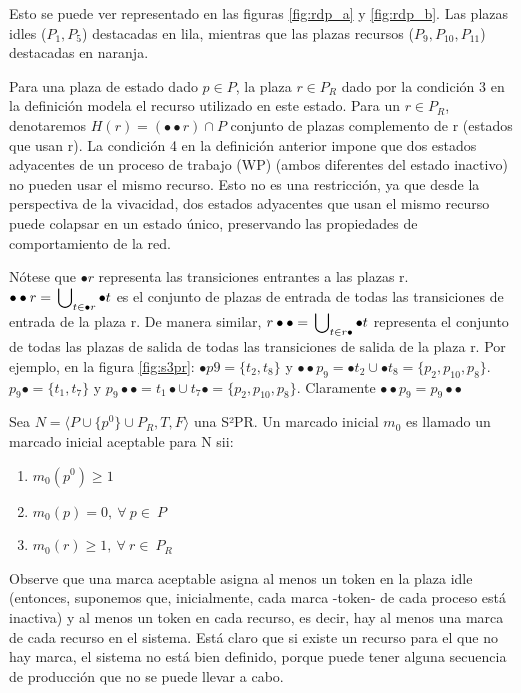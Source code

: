 \noindent Esto se puede ver representado en las figuras \ref{fig:rdp_a} y \ref{fig:rdp_b}. Las plazas idles ($P_1, P_5$) destacadas en lila, mientras que las plazas recursos ($P_9, P_{10}, P_{11}$) destacadas en naranja.\\


\par Para una plaza de estado dado $p \in P$, la plaza $r \in P_R$ dado por la condición 3 en la definición modela el recurso utilizado en este estado. 
Para un $r \in P_R$, denotaremos $H(r) = (\bullet \bullet r) \cap P$ conjunto de plazas complemento de r (estados que usan r). La condición 4 en la definición anterior impone que dos estados adyacentes de un proceso de trabajo (WP) (ambos diferentes del estado inactivo) no pueden usar el mismo recurso. Esto no es una restricción, ya que desde la perspectiva de la vivacidad, dos estados adyacentes que usan el mismo recurso puede colapsar en un estado único, preservando las propiedades de comportamiento de la red. 

Nótese que $\bullet r$ representa las transiciones entrantes a las plazas r. \\
$\bullet \bullet r = \sideset{}{_{t \in \bullet r}} \bigcup \bullet t$ es el conjunto de plazas de entrada de todas las transiciones de entrada de la plaza r. De manera similar,  $r \bullet \bullet = \sideset{}{_{t \in r \bullet}} \bigcup \bullet t$ representa el conjunto de todas las plazas de salida de todas las transiciones de salida de la plaza r. Por ejemplo, en la figura \ref{fig:s3pr}: $\bullet p9 = \{t_2,t_8\}$ y $\bullet \bullet p_9 =  \bullet t_2 \cup  \bullet t_8 = \{p_2, p_{10}, p_8 \}$.  $p_9 \bullet = \{ t_1, t_7 \}$ y $p_9 \bullet \bullet = t_1 \bullet \cup \ t_7 \bullet = \{ p_2, p_{10}, p_8 \}$. Claramente  $\bullet \bullet p_9 = p_9 \bullet \bullet$

Sea $N = \langle P \cup \{p^0\} \cup P_R, T, F \rangle $ una S²PR. Un marcado inicial $m_0$ es llamado un marcado inicial aceptable para N sii:
\bigskip

\begin{enumerate}
    \centering
    \item $m_0 (p^0) \geq 1$
    \item $m_0 (p) = 0, \ \forall \ p \in \ P$
    \item $m_0 (r) \geq 1, \ \forall \ r \in \ P_R$
\end{enumerate}
\bigskip

Observe que una marca aceptable asigna al menos un token en la plaza idle (entonces, suponemos que, inicialmente, cada marca -token- de cada proceso está inactiva) y al menos un token en cada recurso, es decir, hay al menos una marca de cada recurso en el sistema. Está claro que si existe un recurso para el que no hay marca, el sistema no está bien definido, porque puede tener alguna secuencia de producción que no se puede llevar a cabo. 
\bigskip

